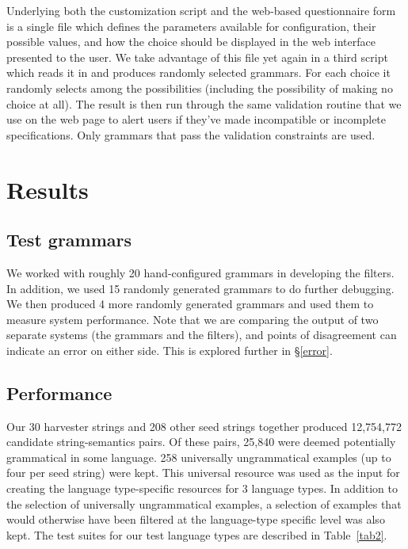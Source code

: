 \documentclass[11pt]{article}
\begin{document}
Underlying both the customization script and the web-based
questionnaire form is a single file which defines the parameters
available for configuration, their possible values, and how the choice
should be displayed in the web interface presented to the user. We
take advantage of this file yet again in a third script which reads it
in and produces randomly selected grammars.  For each choice it randomly
selects among the possibilities (including the possibility of making
no choice at all).  The result is then run through the same validation
routine that we use on the web page to alert users if they've made
incompatible or incomplete specifications.  Only grammars that pass
the validation constraints are used.

\section{Results}

\subsection{Test grammars}

We worked with roughly 20 hand-configured grammars in developing the
filters.  In addition, we used 15 randomly generated grammars 
to do further debugging.  We then produced 4 more randomly
generated grammars and used them to measure system performance. Note
that we are comparing the output of two separate systems (the grammars
and the filters), and points of disagreement can indicate an error
on either side.  This is explored further in \S\ref{error}.

\subsection{Performance}


Our 30 harvester strings and 208 other seed strings together produced
12,754,772 candidate string-semantics pairs.  
Of these pairs, 25,840 were deemed
potentially grammatical in some language.  258 universally
ungrammatical examples (up to four per seed string) were kept.  This
universal resource was used as the input for creating the language
type-specific resources for 3 language types.  In addition to the
selection of universally ungrammatical examples, a selection of
examples that would otherwise have been filtered at the language-type
specific level was also kept.  The test suites for our test language
types are described in Table~\ref{tab2}.
\end{document}

